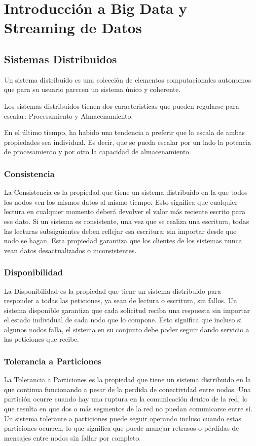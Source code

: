 \section{Introducción a Big Data y Streaming de Datos}

\subsection{Sistemas Distribuidos}
Un sistema distribuido es una colección de elementos computacionales autonomos que para su usuario 
parecen un sistema único y coherente. \parencite{tanenbaum}

Los sistemas distribuidos tienen dos caracteristicas que pueden regularse para escalar: Procesamiento y Almacenamiento.

En el último tiempo, ha habido una tendencia a preferir que la escala de ambas propiedades sea individual. 
Es decir, que se pueda escalar por un lado la potencia de procesamiento y por otro la capacidad de almacenamiento.

\subsubsection{Consistencia}
La Consistencia es la propiedad que tiene un sistema distribuido en la que todos los nodos ven los mismos datos al mismo tiempo.
Esto significa que cualquier lectura en cualquier momento deberá devolver el valor más reciente escrito para ese dato.
Si un sistema es consistente, una vez que se realiza una escritura, todas las lecturas subsiguientes deben reflejar esa escritura;
sin importar desde que nodo se hagan. 
Esta propiedad garantiza que los clientes de los sistemas nunca vean datos desactualizados o inconsistentes.
\newpage
\subsubsection{Disponibilidad}
La Disponibilidad es la propiedad que tiene un sistema distribuido para responder a todas las peticiones, ya sean de lectura o escritura, sin fallos.
Un sistema disponible garantiza que cada solicitud reciba una respuesta sin importar el estado individual de cada nodo que lo compone.
Esto significa que incluso si algunos nodos falla, el sistema en su conjunto debe poder seguir dando servicio a las peticiones que recibe.
\subsubsection{Tolerancia a Particiones}
La Tolerancia a Particiones es la propiedad que tiene un sistema distribuido en la que continua funcionando a pesar de la perdida de 
conectividad entre nodos. Una partición ocurre cuando hay una ruptura en la comunicación dentro de la red, 
lo que resulta en que dos o más segmentos de la red no puedan comunicarse entre sí.
Un sistema tolerante a particiones puede seguir operando incluso cuando estas particiones ocurren, 
lo que significa que puede manejar retrasos o pérdidas de mensajes entre nodos sin fallar por completo. 

